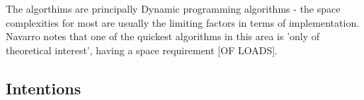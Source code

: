 \documentclass[a4paper,11pt,twoside,notitlepage]{report}
\begin{document}
        The algorthims are principally Dynamic programming algorithms
        - the space complexities for most are usually the limiting
        factors in terms of implementation. Navarro notes that one of
        the quickest algorithms in this area is 'only of theoretical
        interest', having a space requirement [OF LOADS].

        \subsection{Intentions}

{}
	
\end{document}
